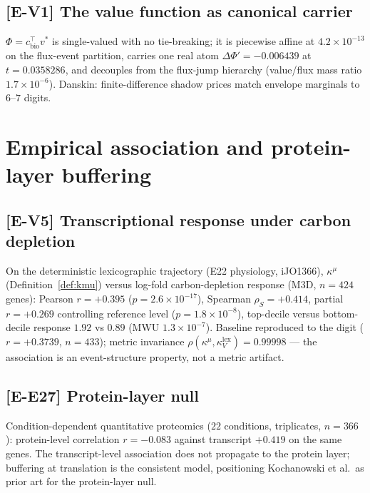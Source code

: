 \documentclass[11pt,a4paper]{article}
\theoremstyle{plain}
\theoremstyle{definition}
\theoremstyle{remark}
\newcommand{\kk}{\kappa_{\!V}}
\newcommand{\kmu}{\kappa^{\mu}}
\begin{document}
\subsection{[E-V1] The value function as canonical carrier}
$\Phi = c_{\mathrm{bio}}^\top v^*$ is single-valued with no tie-breaking;
it is piecewise affine at $4.2 \times 10^{-13}$ on the flux-event
partition, carries one real atom
$\Delta\Phi' = -0.006439$ at $t = 0.0358286$, and decouples from the
flux-jump hierarchy (value/flux mass ratio $1.7 \times 10^{-6}$).
Danskin: finite-difference shadow prices match envelope marginals to
$6$--$7$ digits.

\section{Empirical association and protein-layer buffering}
\label{sec:empirical}


\subsection{[E-V5] Transcriptional response under carbon depletion}
On the deterministic lexicographic trajectory (E22 physiology, iJO1366),
$\kmu$ (Definition~\ref{def:kmu}) versus log-fold carbon-depletion
response (M3D, $n = 424$ genes):
Pearson $r = +0.395$ ($p = 2.6 \times 10^{-17}$), Spearman
$\rho_S = +0.414$, partial $r = +0.269$ controlling reference level
($p = 1.8 \times 10^{-8}$), top-decile versus bottom-decile response
$1.92$ vs $0.89$ (MWU $1.3 \times 10^{-7}$). Baseline reproduced to the
digit ($r = +0.3739$, $n = 433$); metric invariance
$\rho(\kmu, \kk^{\mathrm{lex}}) = 0.99998$ --- the association is an
event-structure property, not a metric artifact.

\subsection{[E-E27] Protein-layer null}
Condition-dependent quantitative proteomics ($22$ conditions, triplicates,
$n = 366$): protein-level correlation $r = -0.083$ against transcript
$+0.419$ on the same genes. The transcript-level association does not
propagate to the protein layer; buffering at translation is the consistent
model, positioning Kochanowski et al.\ as prior art for the protein-layer
null.

\end{document}
